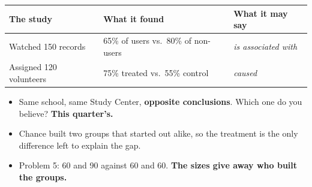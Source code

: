 \documentclass[aspectratio=169, 11pt]{beamer}
\newcommand{\redink}[1]{{\color{redacc}\bfseries #1}}
\begin{document}
\begin{frame}[t, plain]
  \vspace{2pt}
  \begin{center}
    \small
    \renewcommand{\arraystretch}{1.3}
    \begin{tabular}{@{} l l l @{}}
    \hline
    \textbf{The study} & \textbf{What it found} & \textbf{What it may say} \\
    \hline
    Watched 150 records & 65\% of users vs.\ 80\% of non-users & \emph{is associated with} \\
    Assigned 120 volunteers & 75\% treated vs.\ 55\% control & \emph{caused} \\
    \hline
    \end{tabular}
  \end{center}
  \vspace{6pt}
  \begin{itemize}\setlength{\itemsep}{4pt}
    \item Same school, same Study Center, \textbf{opposite conclusions}. Which one do you
          believe? \redink{This quarter's.}
    \item Chance built two groups that started out alike, so the treatment is the only
          difference left to explain the gap.
    \item Problem 5: 60 and 90 against 60 and 60. \redink{The sizes give away who built the
          groups.}
  \end{itemize}
\end{frame}
\end{document}
